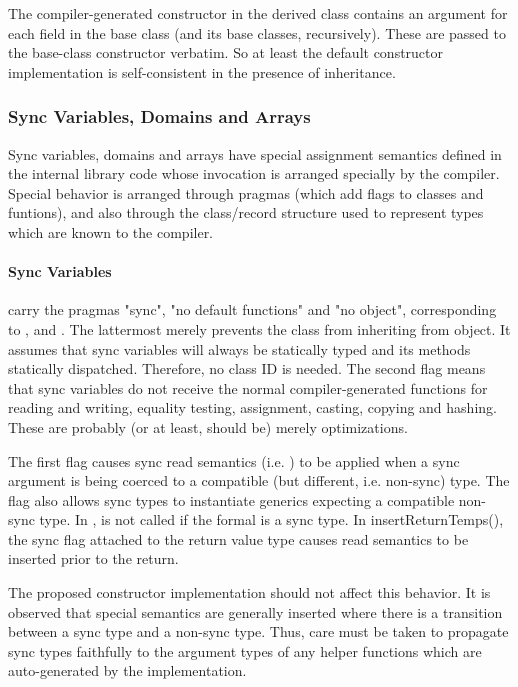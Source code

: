 The compiler-generated constructor in the derived class contains an argument for
each field in the base class (and its base classes, recursively).  These are
passed to the base-class constructor verbatim.  So at least the default
constructor implementation is self-consistent in the presence of inheritance.

\subsubsection{Sync Variables, Domains and Arrays} 

Sync variables, domains and arrays have special assignment semantics defined
in the internal library code whose invocation is arranged specially by the
compiler.  Special behavior is arranged through pragmas (which add flags to classes and
funtions), and also through the class/record structure used to represent types
which are known to the compiler.  

\paragraph{Sync Variables} carry the pragmas "sync", "no default functions" and "no object",
corresponding to ,  and .  The
lattermost merely prevents the  class from inheriting from object.  It
assumes that sync variables will always be statically typed and its methods
statically dispatched.  Therefore, no class ID is needed.  The second flag means
that sync variables do not receive the normal compiler-generated functions for
reading and writing, equality testing, assignment, casting, copying and
hashing.  These are probably (or at least, should be) merely optimizations.

The first flag causes sync read semantics (i.e. ) to be applied
when a sync argument is being coerced to a compatible (but different,
i.e. non-sync) type.  The flag also allows sync types to instantiate generics
expecting a compatible non-sync type.  In ,  is
not called if the formal is a sync type.  In insertReturnTemps(), the sync flag
attached to the return value type causes read semantics to be inserted prior to
the return.

The proposed constructor implementation should not affect this behavior.  It is
observed that special semantics are generally inserted where there is a
transition between a sync type and a non-sync type.  Thus, care must be taken to
propagate sync types faithfully to the argument types of any helper functions
which are auto-generated by the implementation.  


